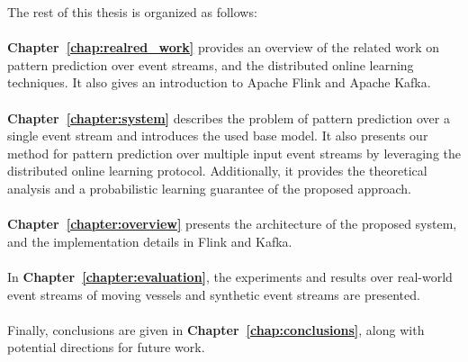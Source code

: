 \par The rest of this thesis is organized as follows:\\
\\
\textbf{Chapter~\ref{chap:realred_work}} provides an overview of the related work on pattern prediction over event streams, and the distributed online learning techniques. It also gives an introduction to Apache Flink and Apache Kafka.
\\
\\
\textbf{Chapter~\ref{chapter:system}} describes the problem of pattern prediction over a single event stream and introduces the used base model. It also presents our method for pattern prediction over multiple input event streams by leveraging the distributed online learning protocol. Additionally, it provides the theoretical analysis and a probabilistic learning guarantee of the proposed approach.  
\\
\\
\textbf{Chapter~\ref{chapter:overview}}  presents the architecture of the proposed system, and the implementation details in Flink and Kafka.
\\
\\
In \textbf{Chapter~\ref{chapter:evaluation}}, the experiments and results over real-world event streams of moving vessels and synthetic event streams are presented.
\\
\\
Finally, conclusions are given in \textbf{Chapter~\ref{chap:conclusions}}, along with potential directions for future work.






